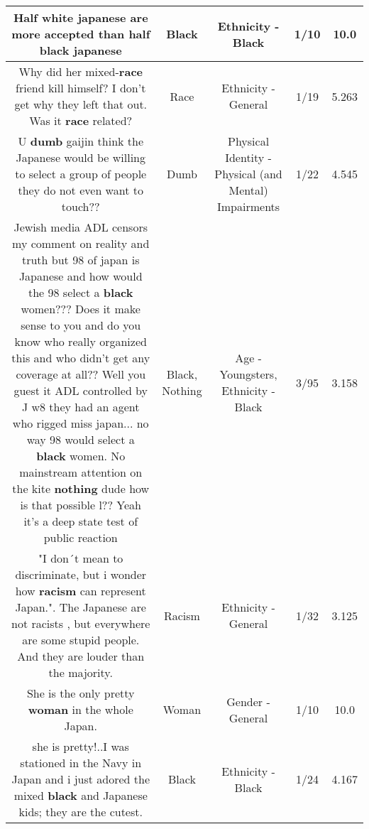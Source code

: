 \documentclass[11pt]{article}
\newlength\mylength
\begin{document}
\begin{center}
\begin{longtable}{|C{.65\mylength}|C{.30\mylength}|C{.12\mylength}|C{.12\mylength}|C{.12\mylength}|}
  \small Half white japanese are more accepted than half \textbf{black} japanese\normalsize   & Black & Ethnicity - Black & 1/10 & 10.0 \\  \hline
  \small Why did her mixed-\textbf{race} friend kill himself? I don't get why they left that out. Was it \textbf{race} related?\normalsize   & Race & Ethnicity - General & 1/19 & 5.263 \\  \hline
  \small U \textbf{dumb} gaijin think the Japanese would be willing to select a group of people they do not even want to touch??\normalsize   & Dumb & Physical Identity - Physical (and Mental) Impairments & 1/22 & 4.545 \\  \hline
  \small Jewish media ADL censors my comment on reality and truth but 98 of japan is Japanese and how would the 98 select a \textbf{black} women??? Does it make sense to you and do you know who really organized this and who didn't get any coverage at all?? Well you guest it ADL controlled by J   w8 they had an agent who rigged miss japan... no way 98 would select a \textbf{black} women. No mainstream attention on the kite \textbf{nothing} dude how is that possible l?? Yeah it's a deep state test of public reaction\normalsize   & Black, Nothing & Age - Youngsters, Ethnicity - Black & 3/95 & 3.158 \\  \hline
  \small "I don´t mean to discriminate, but i wonder how \textbf{racism} can represent Japan.". The Japanese are not racists , but everywhere are some stupid people. And they are louder than the majority.\normalsize   & Racism & Ethnicity - General & 1/32 & 3.125 \\  \hline
  \small She is the only pretty \textbf{woman} in the whole Japan.\normalsize   & Woman & Gender - General & 1/10 & 10.0 \\  \hline
  \small she is pretty!..I was stationed in the Navy in Japan and i just adored the mixed \textbf{black} and Japanese kids; they are the cutest.\normalsize   & Black & Ethnicity - Black & 1/24 & 4.167 \\  \hline

\end{longtable}
\end{center}
\end{document}
